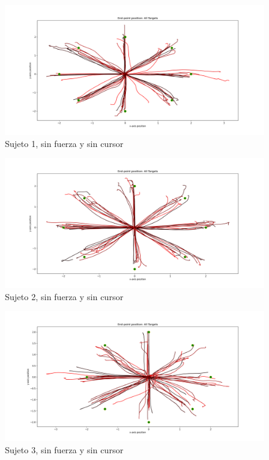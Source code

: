 \documentclass[a4paper,11pt, oneside]{book}
\begin{document}
\begin{figure}[H]
	\includegraphics[width=\linewidth]{sujeto1/no_force_no_cursor/trayectorias}
	\caption{Sujeto 1, sin  fuerza y sin cursor}
	\label{1-3-1}
\end{figure}
\begin{figure}[H]
	\includegraphics[width=\linewidth]{sujeto2/no_force_no_cursor/trayectorias}
	\caption{Sujeto 2, sin  fuerza y sin cursor}
	\label{2-3-1}
\end{figure}
\begin{figure}[H]
	\includegraphics[width=\linewidth]{sujeto3/no_force_no_cursor/trayectorias}
	\caption{Sujeto 3, sin  fuerza y sin cursor}
	\label{3-3-1}
\end{figure}
\end{document}
